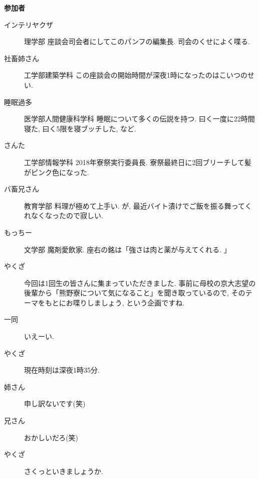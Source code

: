 \documentclass[10pt,b5jsbook,dvips,dvipdfmx,openany]{jsbook}
\theoremstyle{definition}
\begin{document}
		\begin{itembox}[l]{\bf 参加者}
		\begin{description}
		\item[インテリヤクザ] 理学部 座談会司会者にしてこのパンフの編集長. 司会のくせによく喋る.
		\item[社畜姉さん]工学部建築学科 この座談会の開始時間が深夜1時になったのはこいつのせい.
		\item[睡眠過多] 医学部人間健康科学科 睡眠について多くの伝説を持つ. 曰く一度に22時間寝た, 曰く5限を寝ブッチした, など.
		\item[さんた] 工学部情報学科 2018年寮祭実行委員長. 寮祭最終日に2回ブリーチして髪がピンク色になった.
		\item[バ畜兄さん] 教育学部 料理が極めて上手い. が, 最近バイト漬けでご飯を振る舞ってくれなくなったので寂しい.
		\item[もっちー] 文学部 魔剤愛飲家. 座右の銘は「強さは肉と薬が与えてくれる. 」
		\end{description}
		\end{itembox}
\small
		\begin{description}
		\item[やくざ] 今回は1回生の皆さんに集まっていただきました. 事前に母校の京大志望の後輩から「熊野寮について気になること」を聞き取っているので, そのテーマをもとにお喋りしましょう, という企画ですね.
		\item[ 一同 ] いえーい.
		\item[やくざ] 現在時刻は深夜1時35分.
		\item[姉さん] 申し訳ないです(笑)
		\item[兄さん] おかしいだろ(笑)
		\item[やくざ] さくっといきましょうか.
		\end{description}
\end{document}
